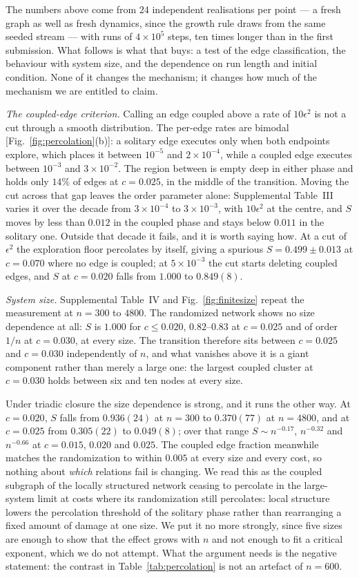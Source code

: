 \documentclass[aps,pre,twocolumn,superscriptaddress,floatfix,longbibliography]{revtex4-2}
\begin{document}
The numbers above come from $24$ independent realisations per point --- a
fresh graph as well as fresh dynamics, since the growth rule draws from the same
seeded stream --- with runs of $4\times10^{5}$ steps, ten times longer than in
the first submission. What follows is what that buys: a test of the edge
classification, the behaviour with system size, and the dependence on run length
and initial condition. None of it changes the mechanism; it changes how much of
the mechanism we are entitled to claim.

\emph{The coupled-edge criterion.} Calling an edge coupled above a rate of
$10\epsilon^{2}$ is not a cut through a smooth distribution. The per-edge rates
are bimodal [Fig.~\ref{fig:percolation}(b)]: a solitary edge executes only when
both endpoints explore, which places it between $10^{-5}$ and $2\times10^{-4}$,
while a coupled edge executes between $10^{-3}$ and $3\times10^{-2}$. The region
between is empty deep in either phase and holds only $14\%$ of edges at
$c=0.025$, in the middle of the transition. Moving the cut across that gap leaves
the order parameter alone: Supplemental Table~III varies it over the decade from
$3\times10^{-4}$ to $3\times10^{-3}$, with $10\epsilon^{2}$ at the centre, and
$S$ moves by less than $0.012$ in the coupled phase and stays below $0.011$ in
the solitary one. Outside that decade it fails, and it is worth saying how. At a
cut of $\epsilon^{2}$ the exploration floor percolates by itself, giving a
spurious $S=0.499\pm0.013$ at $c=0.070$ where no edge is coupled; at
$5\times10^{-3}$ the cut starts deleting coupled edges, and $S$ at $c=0.020$
falls from $1.000$ to $0.849(8)$.

\emph{System size.} Supplemental Table~IV and Fig.~\ref{fig:finitesize} repeat the
measurement at $n=300$ to $4800$. The randomized network shows no size
dependence at all: $S$ is $1.000$ for $c\le0.020$, $0.82$--$0.83$ at $c=0.025$
and of order $1/n$ at $c=0.030$, at every size. The transition therefore sits
between $c=0.025$ and $c=0.030$ independently of $n$, and what vanishes above it
is a giant component rather than merely a large one: the largest coupled cluster
at $c=0.030$ holds between six and ten nodes at every size.

Under triadic closure the size dependence is strong, and it runs the other way.
At $c=0.020$, $S$ falls from $0.936(24)$ at $n=300$ to $0.370(77)$ at
$n=4800$, and at $c=0.025$ from $0.305(22)$ to $0.049(8)$; over that
range $S\sim n^{-0.17}$, $n^{-0.32}$ and $n^{-0.66}$ at $c=0.015$, $0.020$ and
$0.025$. The coupled edge fraction meanwhile matches the randomization to within
$0.005$ at every size and every cost, so nothing about \emph{which} relations
fail is changing. We read this as the coupled subgraph of the locally structured
network ceasing to percolate in the large-system limit at costs where its
randomization still percolates: local structure lowers the percolation threshold
of the solitary phase rather than rearranging a fixed amount of damage at one
size. We put it no more strongly, since five sizes are enough to show that the
effect grows with $n$ and not enough to fit a critical exponent, which we do not
attempt. What the argument needs is the negative statement: the contrast in
Table~\ref{tab:percolation} is not an artefact of $n=600$.
\end{document}
